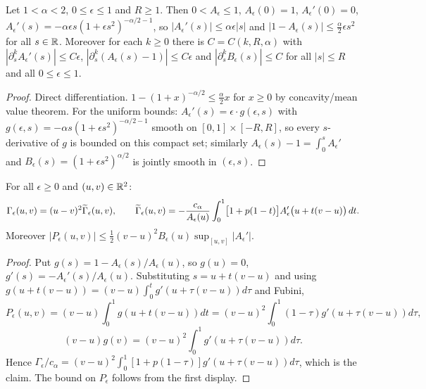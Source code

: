 \begin{lemma}
  \label{lem:c03_A_eps_bounds}
  Let $1<\alpha<2$, $0\le\epsilon\le1$ and $R\ge1$. Then
  $0<A_\epsilon\le1$, $A_\epsilon(0)=1$, $A_\epsilon'(0)=0$,
  $A_\epsilon'(s)=-\alpha\epsilon s(1+\epsilon s^2)^{-\alpha/2-1}$, so $|A_\epsilon'(s)|\le\alpha\epsilon|s|$ and
  $|1-A_\epsilon(s)|\le\frac\alpha2\epsilon s^2$ for all $s\in\mathbb{R}$.
  Moreover for each $k\ge0$ there is $C=C(k,R,\alpha)$ with
  $|\partial_s^kA_\epsilon'(s)|\le C\epsilon$, $|\partial_s^k(A_\epsilon(s)-1)|\le C\epsilon$ and $|\partial_s^kB_\epsilon(s)|\le C$
  for all $|s|\le R$ and all $0\le\epsilon\le1$.
\end{lemma}
\begin{proof}
  Direct differentiation. $1-(1+x)^{-\alpha/2}\le\frac\alpha2x$ for $x\ge0$ by concavity/mean value theorem.
  For the uniform bounds: $A_\epsilon'(s)=\epsilon\cdot g(\epsilon,s)$ with
  $g(\epsilon,s)=-\alpha s(1+\epsilon s^2)^{-\alpha/2-1}$ smooth on $[0,1]\times[-R,R]$, so every $s$-derivative of $g$ is bounded on this compact set;
  similarly $A_\epsilon(s)-1=\int_0^sA_\epsilon'$ and $B_\epsilon(s)=(1+\epsilon s^2)^{\alpha/2}$ is jointly smooth in $(\epsilon,s)$.
\end{proof}

\begin{lemma}
  \label{lem:c03_Gamma_quadratic_factor}
  For all $\epsilon\ge0$ and $(u,v)\in\mathbb{R}^2$:
  \begin{equation}\label{eqn:analysis_kernel_quadratic_factor}
    \Gamma_\epsilon(u,v)=(u-v)^2\widetilde{\Gamma}_\epsilon(u,v),\qquad
    \widetilde{\Gamma}_\epsilon(u,v)=-\frac{c_\alpha}{A_\epsilon(u)}\int_0^1\bigl[1+p(1-t)\bigr]A_\epsilon'\bigl(u+t(v-u)\bigr)\,dt .
  \end{equation}
  Moreover $|P_\epsilon(u,v)|\le\frac12(v-u)^2B_\epsilon(u)\sup_{[u,v]}|A_\epsilon'|$.
\end{lemma}
\begin{proof}
  Put $g(s)=1-A_\epsilon(s)/A_\epsilon(u)$, so $g(u)=0$, $g'(s)=-A_\epsilon'(s)/A_\epsilon(u)$.
  Substituting $s=u+t(v-u)$ and using $g(u+t(v-u))=(v-u)\int_0^tg'(u+\tau(v-u))d\tau$ and Fubini,
  \[
    P_\epsilon(u,v)=(v-u)\int_0^1g(u+t(v-u))dt=(v-u)^2\int_0^1(1-\tau)g'(u+\tau(v-u))d\tau,
  \]
  \[
    (v-u)g(v)=(v-u)^2\int_0^1g'(u+\tau(v-u))d\tau .
  \]
  Hence $\Gamma_\epsilon/c_\alpha=(v-u)^2\int_0^1[1+p(1-\tau)]g'(u+\tau(v-u))d\tau$, which is the claim.
  The bound on $P_\epsilon$ follows from the first display.
\end{proof}


